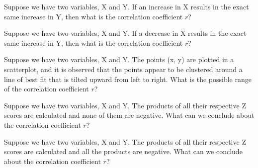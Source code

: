 \documentclass[11pt, chapterprefix=true]{scrbook}\usepackage[]{graphicx}\usepackage[]{color}
\begin{document}
\begin{exercises}
\begin{exercise}
Suppose we have two variables, X and Y. If an increase in X results in the exact same increase in Y, then what is the correlation coefficient $r$?
\end{exercise}
\begin{solution} %

\end{solution}

\begin{exercise} %

Suppose we have two variables, X and Y. If a decrease in X results in the exact same increase in Y, then what is the correlation coefficient $r$?
\end{exercise}
\begin{solution} %

\end{solution}

\begin{exercise} %

Suppose we have two variables, X and Y. The points (x, y) are plotted in a scatterplot, and it is observed that the points appear to be clustered around a 
line of best fit that is tilted upward from left to right.  What is the possible range of the correlation coefficient $r$?
\end{exercise}
\begin{solution} %

\end{solution}


\begin{exercise} %

Suppose we have two variables, X and Y. The products of all their respective Z scores are calculated and none of them are negative. What can we conclude about the correlation coefficient $r$?
\end{exercise}
\begin{solution} %

\end{solution}

\begin{exercise} %

Suppose we have two variables, X and Y. The products of all their respective Z scores are calculated and all the products are negative. What can we conclude about the correlation coefficient $r$?
\end{exercise}
\begin{solution} %

\end{solution}
\end{exercises}
\end{document}
